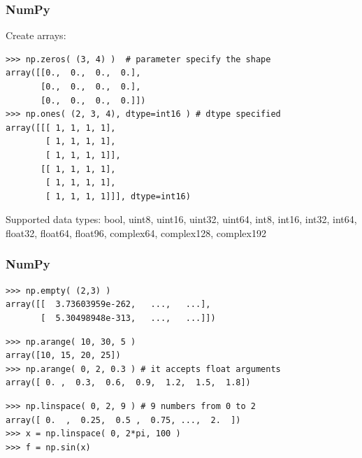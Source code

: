 \begin{frame}[fragile]
    \frametitle{NumPy}
Create arrays:
    \begin{myColorBox}{1.0}{}
\begin{verbatim}
>>> np.zeros( (3, 4) )  # parameter specify the shape
array([[0.,  0.,  0.,  0.],
       [0.,  0.,  0.,  0.],
       [0.,  0.,  0.,  0.]])
>>> np.ones( (2, 3, 4), dtype=int16 ) # dtype specified
array([[[ 1, 1, 1, 1],
        [ 1, 1, 1, 1],
        [ 1, 1, 1, 1]],
       [[ 1, 1, 1, 1],
        [ 1, 1, 1, 1],
        [ 1, 1, 1, 1]]], dtype=int16)
\end{verbatim}
    \end{myColorBox}
Supported data types: bool, uint8, uint16, uint32, uint64, int8, int16, int32, int64, float32, float64, float96, complex64, complex128, complex192 
\end{frame}

\begin{frame}[fragile]
    \frametitle{NumPy}
    \begin{myColorBox}{1.0}{}
\begin{verbatim}
>>> np.empty( (2,3) )
array([[  3.73603959e-262,   ...,   ...],
       [  5.30498948e-313,   ...,   ...]])
\end{verbatim}
    \end{myColorBox}
    \pause
    \begin{myColorBox}{1.0}{}
\begin{verbatim}
>>> np.arange( 10, 30, 5 )
array([10, 15, 20, 25])
>>> np.arange( 0, 2, 0.3 ) # it accepts float arguments
array([ 0. ,  0.3,  0.6,  0.9,  1.2,  1.5,  1.8])
\end{verbatim}
    \end{myColorBox}
    \pause
    \begin{myColorBox}{1.0}{}
\begin{verbatim}
>>> np.linspace( 0, 2, 9 ) # 9 numbers from 0 to 2
array([ 0.  ,  0.25,  0.5 ,  0.75, ...,  2.  ])
>>> x = np.linspace( 0, 2*pi, 100 )
>>> f = np.sin(x)
\end{verbatim}
    \end{myColorBox}
\end{frame}

